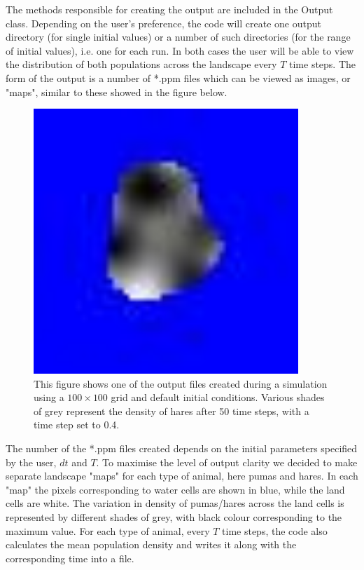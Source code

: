 \documentclass[11pt]{report}
\begin{document}
      The methods responsible for creating the output are included in the Output class. Depending on the user's preference, the code will create one output directory (for single initial values) or a number of such directories (for the range of initial values), i.e. one for each run. In both cases the user will be able to view the distribution of both populations across the landscape every $T$ time steps. The form of the output is a number of *.ppm files which can be viewed as images, or "maps", similar to these showed in the figure below.
      
      \begin{figure}[H]
      \begin{center}
      \includegraphics[width=100mm,height=100mm]{figs/hare}
      \caption{This figure shows one of the output files created during a simulation using a $100 \times 100$ grid and default initial conditions. Various shades of grey represent the density of hares after 50 time steps, with a time step set to 0.4.}
      \end{center}
      \end{figure}
      
      The number of the *.ppm files created depends on the initial parameters specified by the user, $dt$ and $T$. To maximise the level of output clarity we decided to make separate landscape "maps" for each type of animal, here pumas and hares. In each "map" the pixels corresponding to water cells are shown in blue, while the land cells are white. The variation in density of pumas/hares across the land cells is represented by different shades of grey, with black colour corresponding to the maximum value. 
      \newline{}
      For each type of animal, every $T$ time steps, the code also calculates the mean population density and writes it along with the corresponding time into a file. 
      
\end{document}
